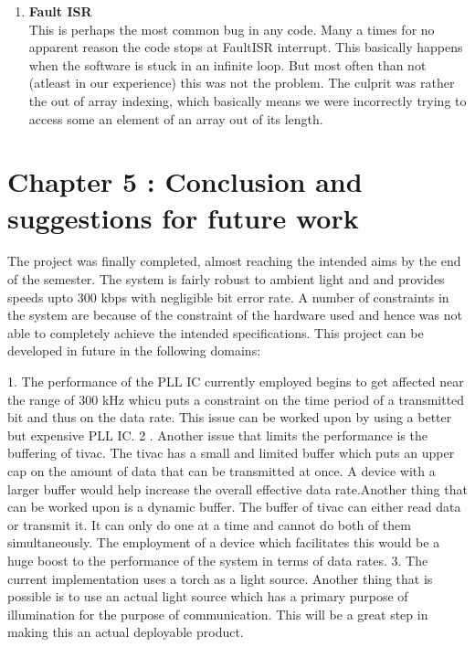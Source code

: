 \documentclass{article}
\begin{document}
\begin{enumerate}
\item \textbf{Fault ISR}\\
  This is perhaps the most common bug in any code. Many a times for no apparent reason the code stops at FaultISR interrupt. This basically happens when the software is stuck in an infinite loop. But most often than not (atleast in our experience) this was not the problem. The culprit was rather the out of array indexing, which basically means we were incorrectly trying to access some an element of an array out of its length. 
\end{enumerate}

\section{Chapter 5 : Conclusion and suggestions for future work}

The project was finally completed, almost reaching the intended aims by the end of the semester. The system is fairly robust to ambient light and and provides speeds upto $300$ kbps with negligible bit error rate. A number of constraints in the system are because of the constraint of the hardware used and hence was not able to completely achieve the intended specifications. This project can be developed in future in the following domains:

1. The performance of the PLL IC currently employed begins to get affected near the range of $300$ kHz whicu puts a constraint on the time period of a transmitted bit and thus on the data rate. This issue can be worked upon by using a better but expensive PLL IC. 
2 . Another issue that limits the performance is the buffering of tivac. The tivac has a small and limited buffer which puts an upper cap on the amount of data that can be transmitted at once. A device with a larger buffer would help increase the overall effective data rate.Another thing that can be worked upon is a dynamic buffer. The buffer of tivac can either read data or transmit it. It can only do one at a time and cannot do both of them simultaneously. The employment of a device which facilitates this would be a huge boost to the performance of the system in terms of data rates.
3. The current implementation uses a torch as a light source. Another thing that is possible is to use an actual light source which has a primary purpose of illumination for the purpose of communication. This will be a great step in making this an actual deployable product. 
\end{document}
